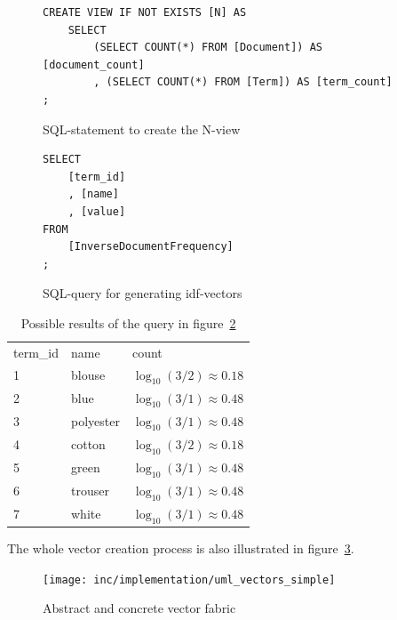 \begin{figure}
    \lstset{language=SQL}
    \begin{lstlisting}
CREATE VIEW IF NOT EXISTS [N] AS
    SELECT
        (SELECT COUNT(*) FROM [Document]) AS [document_count]
        , (SELECT COUNT(*) FROM [Term]) AS [term_count]
;
    \end{lstlisting}
    \caption{SQL-statement to create the N-view}
    \label{fig:n-view}
\end{figure}


\begin{figure}
    \lstset{language=SQL}
    \begin{lstlisting}
SELECT
    [term_id]
    , [name]
    , [value]
FROM
    [InverseDocumentFrequency]
;
    \end{lstlisting}
    \caption{SQL-query for generating idf-vectors}
    \label{fig:idf-query}
\end{figure}


\begin{table}
    \center
    \begin{tabular}{ l | l | l } 
        \rowcolor{\dustRowHead}
        \multicolumn{3}{ c }{\textbf{idf}}\\\hline
        term\_id    & name      & count\\\hline
        1           & blouse    & $\log_{10}(3/2) \approx 0.18$\\
        2           & blue      & $\log_{10}(3/1) \approx 0.48$\\
        3           & polyester & $\log_{10}(3/1) \approx 0.48$\\
        4           & cotton    & $\log_{10}(3/2) \approx 0.18$\\
        5           & green     & $\log_{10}(3/1) \approx 0.48$\\
        6           & trouser   & $\log_{10}(3/1) \approx 0.48$\\
        7           & white     & $\log_{10}(3/1) \approx 0.48$\\
    \end{tabular}
    \caption{Possible results of the query in figure~\ref{fig:idf-query}}
    \label{tab:idf-query-result}
\end{table}




\noindent
The whole vector creation process is also illustrated in figure~\ref{fig:uml-vectorssimple}.
\begin{figure}[h]
    \center
    \texttt{[image: inc/implementation/uml\_vectors\_simple]}
    \caption{Abstract and concrete vector fabric}
    \label{fig:uml-vectorssimple}
\end{figure}


